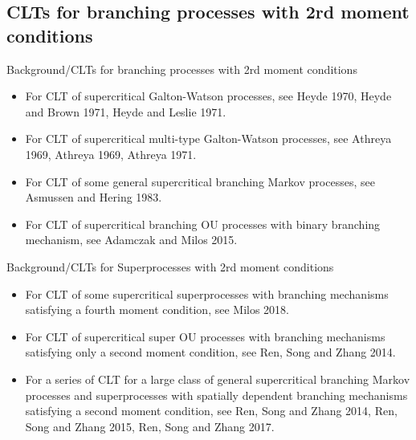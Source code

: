 \documentclass[xcolor=dvipsnames]{beamer}
\begin{document}
\subsection{CLTs for branching processes with 2rd moment conditions}
\begin{frame}{Background/CLTs for branching processes with 2rd moment conditions}
\begin{itemize}
\item
	For CLT of supercritical {\color{red} Galton-Watson processes}, see Heyde 1970, Heyde and Brown 1971, Heyde and Leslie 1971.
\item 
	For CLT of supercritical  {\color{red} multi-type Galton-Watson processes}, see Athreya 1969, Athreya 1969, Athreya 1971.
\item
	For CLT of some general supercritical {\color{red} branching Markov processes}, see Asmussen and Hering 1983.
\item
	For CLT of supercritical {\color{red} branching OU processes} with {\color{red} binary branching} mechanism, see Adamczak and Milos 2015.
\end{itemize}
\end{frame}

\begin{frame}{Background/CLTs for Superprocesses with 2rd moment conditions}
\begin{itemize}
\item
	For CLT of some supercritical {\color{red} superprocesses} with branching mechanisms satisfying a {\color{red} fourth moment condition}, see Milos 2018.
\item
	For CLT of supercritical {\color{red} super OU processes} with branching mechanisms satisfying only a {\color{red} second moment condition}, see Ren, Song and Zhang 2014.
\item
	For a series of CLT for a large class of general supercritical {\color{red} branching Markov processes} and {\color{red} superprocesses} with {\color{red} spatially dependent branching mechanisms} satisfying a {\color{red} second moment condition}, see Ren, Song and Zhang 2014, Ren, Song and Zhang 2015, Ren, Song and Zhang 2017.
\end{itemize}
\end{frame}
\end{document}
